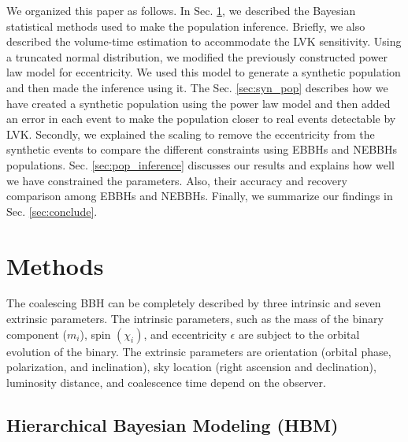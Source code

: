\documentclass[twocolumn,prd,nofootinbib]{revtex4}
\begin{document}





We organized this paper as follows. In Sec. \ref{sec:methods}, we described the Bayesian statistical methods used to make the population inference. Briefly, we also described the volume-time estimation to accommodate the LVK sensitivity. Using a truncated normal distribution, we modified the previously constructed\cite{fishbach-2017,2018talbot_bbh_model} power law model for eccentricity. We used this model to generate a synthetic population and then made the inference using it. The Sec. \ref{sec:syn_pop} describes how we have created a synthetic population using the power law model and then added an error in each event to make the population closer to real events detectable by LVK. Secondly, we explained the scaling to remove the eccentricity from the synthetic events to compare the different constraints using EBBHs and NEBBHs populations. Sec. \ref{sec:pop_inference} discusses our results and explains how well we have constrained the parameters. Also, their accuracy and recovery comparison among EBBHs and NEBBHs. Finally, we summarize our findings in Sec. \ref{sec:conclude}.








\section{Methods}
\label{sec:methods}

The coalescing BBH can be completely described by three intrinsic and seven extrinsic parameters. The intrinsic parameters, such as the mass of the binary component ($m_i$), spin $( \chi_i)$, and eccentricity $\epsilon$  are subject to the orbital evolution of the binary. The extrinsic parameters are orientation (orbital phase, polarization, and inclination), sky location (right ascension and declination), luminosity distance, and coalescence time depend on the observer.



\subsection{Hierarchical Bayesian Modeling (HBM)}
\end{document}
